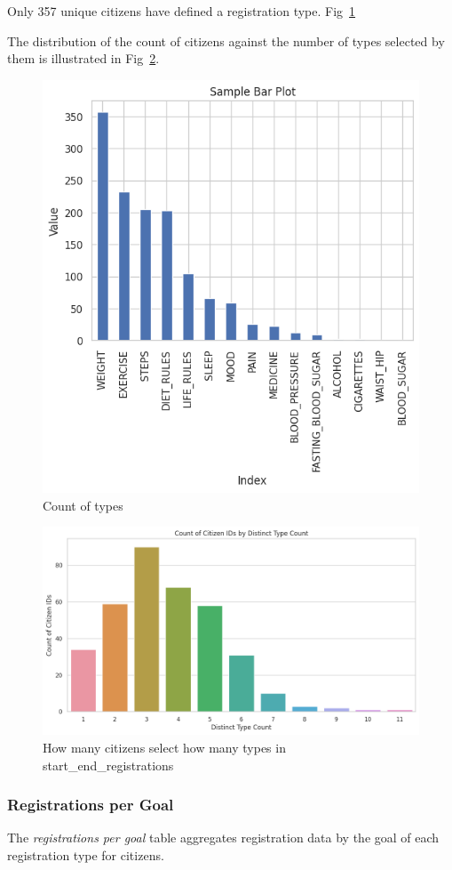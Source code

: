 \documentclass[12pt]{article}
\begin{document}
Only 357 unique citizens have defined a registration type. 
Fig~\ref{fig:countoftypes}

The distribution of the count of citizens against the number of types selected by them is illustrated in Fig~\ref{fig:howmanytypes}.

\begin{figure}[h]
\centering
\includegraphics[width=0.7\linewidth]{images/reg_types.png}
\caption{Count of types}
\label{fig:countoftypes}
\end{figure}

\begin{figure}[h]
\centering
\includegraphics[width=0.7\linewidth]{images/start_end_reg_count.png}
\caption{How many citizens select how many types in start\_end\_registrations}
\label{fig:howmanytypes}
\end{figure}

\subsubsection{Registrations per Goal}
The \textit{registrations per goal} table aggregates registration data by the goal of each registration type for citizens. 
\end{document}
